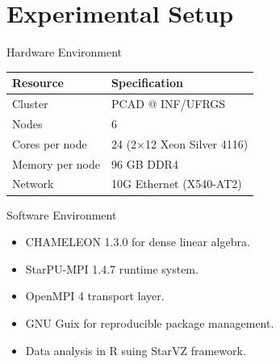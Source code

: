 \documentclass[12pt,xcolor=dvipsnames,presentation,aspectratio=169]{beamer}
\begin{document}
{\section{Experimental Setup}
\label{sec:org05cc1aa}
\begin{frame}[label={sec:org5261af6}]{Hardware Environment}
\begin{center}
\begin{tabular}{ll}
Resource & Specification\\
\hline
Cluster & PCAD @ INF/UFRGS\\
Nodes & 6\\
Cores per node & 24 (2×12 Xeon Silver 4116)\\
Memory per node & 96 GB DDR4\\
Network & 10G Ethernet (X540-AT2)\\
\end{tabular}
\end{center}
\end{frame}
\begin{frame}[label={sec:org23ee8e2}]{Software Environment}
\begin{itemize}
\item CHAMELEON 1.3.0 for dense linear algebra.
\item StarPU-MPI 1.4.7 runtime system.
\item OpenMPI 4 transport layer.
\item GNU Guix for reproducible package management.
\item Data analysis in R suing StarVZ framework.
\end{itemize}
\end{frame}
}
\end{document}
